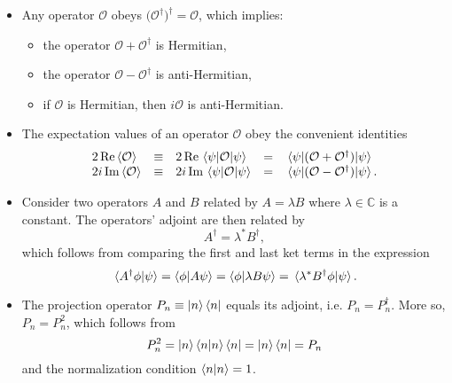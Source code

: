 \documentclass[11pt, a4paper]{article}
\newcommand{\Herm}{Hermitian\xspace}
\renewcommand{\O}{\mathcal{O}}  %
\newcommand{\p}{\psi}  %
\begin{document}
\begin{itemize}
	\item Any operator $ \O $ obeys $ \big(\O^{\dagger}\big)^{\dagger} = \O $, which implies:
    \begin{itemize}
        \item the operator  $ \O + \O^{\dagger} $ is \Herm,

        \item the operator $ \O - \O^{\dagger} $ is anti-\Herm,

        \item if $ \O $ is \Herm, then $ i\O $ is anti-\Herm.
    \end{itemize}
	
	\item The expectation values of an operator $ \O $ obey the convenient identities
	\begin{equation*}
	\begin{array}{lclcl}
		2 \Re \ev{\O} & \equiv & 2 \Re \mel{\p}{\O}{\p} & = & \mel{\p}{(\O + \O^{\dag})}{\p}\\
		2i \Im \ev{\O} & \equiv & 2i \Im \mel{\p}{\O}{\p} & = & \mel{\p}{(\O - \O^{\dag})}{\p}.
	\end{array}
	\end{equation*}
	
	\item Consider two operators $ A $ and $ B $ related by $ A = \lambda B $ where $ \lambda \in \mathbb{C} $ is a constant. The operators' adjoint are then related by
	\begin{equation*}
		A^{\dagger} = \lambda^{*}B^{\dagger},
	\end{equation*}
	which follows from comparing the first and last ket terms in the expression
	\begin{equation*}
		\braket*{A^{\dagger}\phi}{\p} = \braket{\phi}{A \p} = \braket{\phi}{\lambda B \p} = \braket*{\lambda^{*}B^{\dagger}\phi}{\p}.
	\end{equation*}
	
	\item The projection operator $ P_{n} \equiv \ket{n}\bra{n} $ equals its adjoint, i.e. $ P_{n} = P_{n}^{\dagger} $. More so, $ P_{n} = P_{n}^{2} $, which follows from
	\begin{equation*}
		P_{n}^{2} = \ket{n}\bra{n} \ket{n}\bra{n} = \ket{n}\bra{n} = P_{n}
	\end{equation*}
	and the normalization condition $ \braket{n}{n} = 1 $.
	
\end{itemize}
\end{document}
